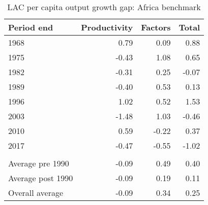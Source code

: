 \begin{table}[!h]

\caption{\label{tab:}LAC per capita output growth gap: Africa benchmark}
\centering
\begin{tabular}[t]{lrrr}
\toprule
Period end & Productivity & Factors & Total\\
\midrule
1968 & 0.79 & 0.09 & 0.88\\
1975 & -0.43 & 1.08 & 0.65\\
1982 & -0.31 & 0.25 & -0.07\\
1989 & -0.40 & 0.53 & 0.13\\
1996 & 1.02 & 0.52 & 1.53\\
2003 & -1.48 & 1.03 & -0.46\\
2010 & 0.59 & -0.22 & 0.37\\
2017 & -0.47 & -0.55 & -1.02\\
\addlinespace[0.3em]
\multicolumn{4}{l}{\textbf{Averages}}\\
\hspace{1em}Average pre 1990 & -0.09 & 0.49 & 0.40\\
\hspace{1em}Average post 1990 & -0.09 & 0.19 & 0.11\\
\hspace{1em}Overall average & -0.09 & 0.34 & 0.25\\
\bottomrule
\end{tabular}
\end{table}